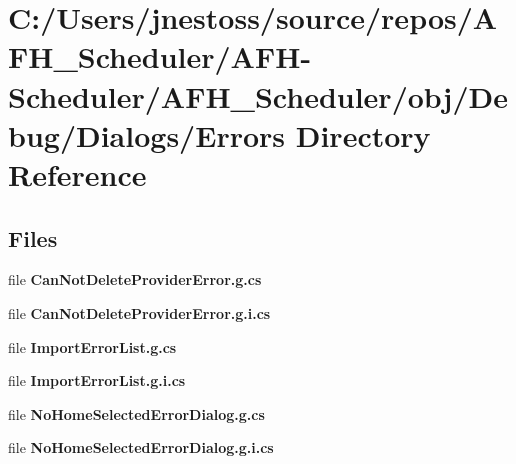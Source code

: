 \section{C\+:/\+Users/jnestoss/source/repos/\+A\+F\+H\+\_\+\+Scheduler/\+A\+F\+H-\/\+Scheduler/\+A\+F\+H\+\_\+\+Scheduler/obj/\+Debug/\+Dialogs/\+Errors Directory Reference}
\label{dir_12aeaea62a53252ae7c4a5b7340a9bf8}
\subsection*{Files}
\begin{DoxyCompactItemize}
\item 
file \textbf{ Can\+Not\+Delete\+Provider\+Error.\+g.\+cs}
\item 
file \textbf{ Can\+Not\+Delete\+Provider\+Error.\+g.\+i.\+cs}
\item 
file \textbf{ Import\+Error\+List.\+g.\+cs}
\item 
file \textbf{ Import\+Error\+List.\+g.\+i.\+cs}
\item 
file \textbf{ No\+Home\+Selected\+Error\+Dialog.\+g.\+cs}
\item 
file \textbf{ No\+Home\+Selected\+Error\+Dialog.\+g.\+i.\+cs}
\end{DoxyCompactItemize}
